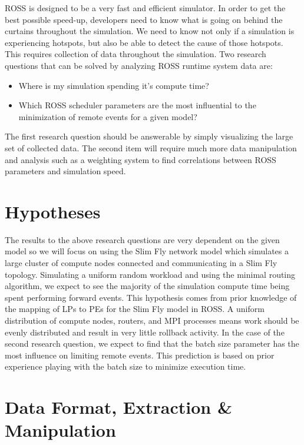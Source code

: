 \documentclass[12pt]{article}
\begin{document}
ROSS is designed to be a very fast and efficient simulator. In order to get the best possible speed-up, developers need to know what is going on behind the curtains throughout the simulation. We need to know not only if a simulation is experiencing hotspots, but also be able to detect the cause of those hotspots. This requires collection of data throughout the simulation. Two research questions that can be solved by analyzing ROSS runtime system data are:

\begin{itemize}
  \item Where is my simulation spending it's compute time?
  \item Which ROSS scheduler parameters are the most influential to the minimization of remote events for a given model?
\end{itemize}

The first research question should be answerable by simply visualizing the large set of collected data. 
The second item will require much more data manipulation and analysis such as a weighting system to find correlations between ROSS parameters and simulation speed.

\section{Hypotheses}

The results to the above research questions are very dependent on the given model so we will focus on using the Slim Fly network model which simulates a large cluster of compute nodes connected and communicating in a Slim Fly topology. Simulating a uniform random workload and using the minimal routing algorithm, we expect to see the majority of the simulation compute time being spent performing forward events. This hypothesis comes from prior knowledge of the mapping of LPs to PEs for the Slim Fly model in ROSS. A uniform distribution of compute nodes, routers, and MPI processes means work should be evenly distributed and result in very little rollback activity. In the case of the second research question, we expect to find that the batch size parameter has the most influence on limiting remote events. This prediction is based on prior experience playing with the batch size to minimize execution time.

\section{Data Format, Extraction \& Manipulation} 
\end{document}
